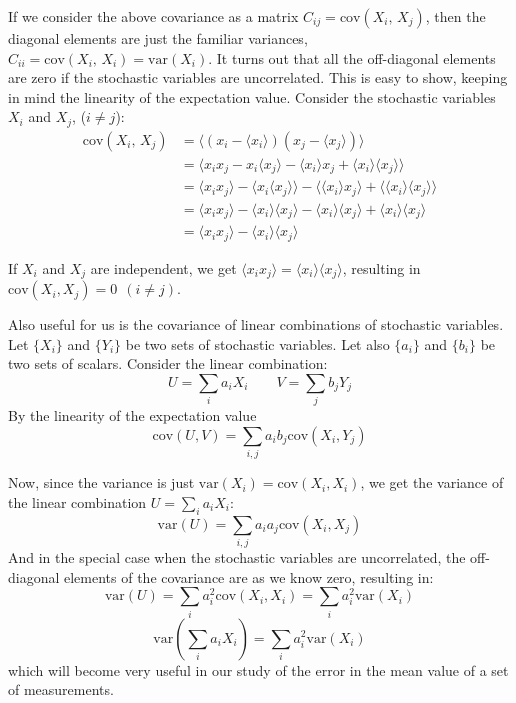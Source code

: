 \documentclass[graybox,sectrefs,envcountresetchap,open=right]{svmonodo}
\begin{document}
If we consider the above covariance as a matrix $C_{ij}=\mathrm{cov}(X_i,\,X_j)$, then the diagonal elements are just the familiar
variances, $C_{ii} = \mathrm{cov}(X_i,\,X_i) = \mathrm{var}(X_i)$. It turns out that
all the off-diagonal elements are zero if the stochastic variables are
uncorrelated. This is easy to show, keeping in mind the linearity of
the expectation value. Consider the stochastic variables $X_i$ and
$X_j$, ($i\neq j$):
\begin{align}
\mathrm{cov}(X_i,\,X_j) &= \langle(x_i-\langle x_i\rangle)(x_j-\langle x_j\rangle)\rangle\\
&=\langle x_i x_j - x_i\langle x_j\rangle - \langle x_i\rangle x_j + \langle x_i\rangle\langle x_j\rangle\rangle \\
&=\langle x_i x_j\rangle - \langle x_i\langle x_j\rangle\rangle - \langle \langle x_i\rangle x_j\rangle +
\langle \langle x_i\rangle\langle x_j\rangle\rangle\\
&=\langle x_i x_j\rangle - \langle x_i\rangle\langle x_j\rangle - \langle x_i\rangle\langle x_j\rangle +
\langle x_i\rangle\langle x_j\rangle\\
&=\langle x_i x_j\rangle - \langle x_i\rangle\langle x_j\rangle
\end{align}







If $X_i$ and $X_j$ are independent, we get 
$\langle x_i x_j\rangle =\langle x_i\rangle\langle x_j\rangle$, resulting in $\mathrm{cov}(X_i, X_j) = 0\ \ (i\neq j)$.

Also useful for us is the covariance of linear combinations of
stochastic variables. Let $\{X_i\}$ and $\{Y_i\}$ be two sets of
stochastic variables. Let also $\{a_i\}$ and $\{b_i\}$ be two sets of
scalars. Consider the linear combination:
\[
U = \sum_i a_i X_i \qquad V = \sum_j b_j Y_j
\]
By the linearity of the expectation value
\[
\mathrm{cov}(U, V) = \sum_{i,j}a_i b_j \mathrm{cov}(X_i, Y_j)
\]





Now, since the variance is just $\mathrm{var}(X_i) = \mathrm{cov}(X_i, X_i)$, we get
the variance of the linear combination $U = \sum_i a_i X_i$:
\begin{equation}
\mathrm{var}(U) = \sum_{i,j}a_i a_j \mathrm{cov}(X_i, X_j)
\label{eq:variance_linear_combination}
\end{equation}
And in the special case when the stochastic variables are
uncorrelated, the off-diagonal elements of the covariance are as we
know zero, resulting in:
\[
\mathrm{var}(U) = \sum_i a_i^2 \mathrm{cov}(X_i, X_i) = \sum_i a_i^2 \mathrm{var}(X_i)
\]
\[
\mathrm{var}(\sum_i a_i X_i) = \sum_i a_i^2 \mathrm{var}(X_i)
\]
which will become very useful in our study of the error in the mean
value of a set of measurements.
\end{document}
